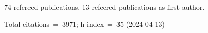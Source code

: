 74 refereed publications. 13 refeered publications as first author.

Total citations~=~3971; h-index~=~35 (2024-04-13)